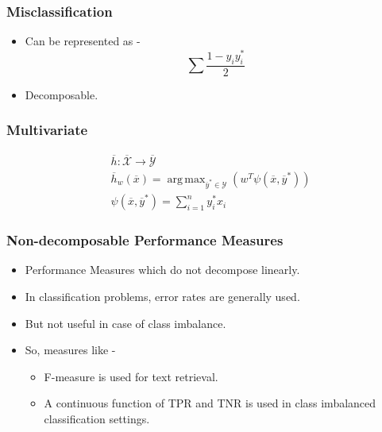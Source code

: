 \documentclass{beamer}
\DeclareMathOperator*{\argmax}{arg\,max}
\begin{document}

\begin{frame}
	\frametitle{Misclassification}
	\begin{itemize}
		\item Can be represented as -
		\begin{equation*}
		\sum \frac{1-y_iy_i^*}{2}
		\end{equation*}
		\item Decomposable.
	\end{itemize}	
\end{frame}


\begin{frame}
	\frametitle{Multivariate}
	\begin{equation*}
	\begin{split}
		& \overline{h}:\overline{\mathcal{X}} \rightarrow \overline{\mathcal{Y}}\\
		& \overline{h}_w(\overline{x})=\argmax_{\overline{y}^*\in\mathcal{Y}}(w^T\psi({\overline{x},\overline{y}^*}))\\
		& \psi(\overline{x},\overline{y}^*) = \sum_{i=1}^n y_i^*x_i
	\end{split}
	\end{equation*}
\end{frame}


\begin{frame}
	\frametitle{Non-decomposable Performance Measures}
	\begin{itemize}
		\item Performance Measures which do not decompose linearly.
		\item In classification problems, error rates are generally used.
		\item But not useful in case of class imbalance.
		\item So, measures like -
		\begin{itemize}
			\item F-measure is used for text retrieval.
			\item A continuous function of TPR and TNR is used in class imbalanced classification settings.
		\end{itemize}
	\end{itemize}
\end{frame}

\end{document}

